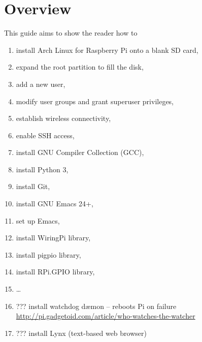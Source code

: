 \documentclass[12pt,letterpaper]{article}
\begin{document}
\section{Overview}
This guide aims to show the reader how to
\begin{enumerate}
\item install Arch Linux for Raspberry Pi onto a blank SD card,
\item expand the root partition to fill the disk,
\item add a new user,
\item modify user groups and grant superuser privileges,
\item establish wireless connectivity,
\item enable SSH access,
\item install GNU Compiler Collection (GCC), %
\item install Python 3,
\item install Git,
\item install GNU Emacs 24+,
\item set up Emacs,
\item install WiringPi library,
\item install pigpio library,
\item install RPi.GPIO library,
\item \ldots
\item ??? install watchdog d\ae mon -- reboots Pi on failure \url{http://pi.gadgetoid.com/article/who-watches-the-watcher}
\item ??? install Lynx (text-based web browser)
\end{enumerate}
\end{document}
